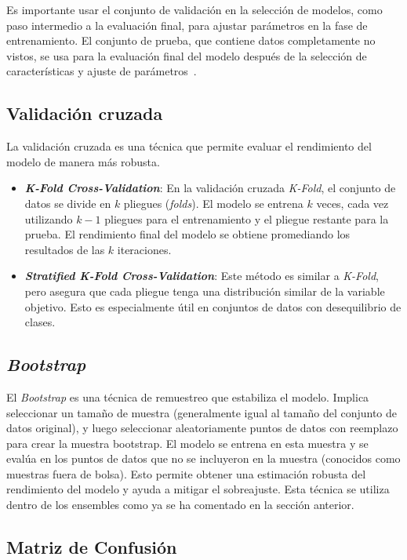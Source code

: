 Es importante usar el conjunto de validación en la selección de modelos, como paso intermedio a la evaluación final, para ajustar parámetros en la fase de entrenamiento. El conjunto de prueba, que contiene datos completamente no vistos, se usa para la evaluación final del modelo después de la selección de características y ajuste de parámetros~\cite{web:evaluate}.

\subsection{Validación cruzada}
La validación cruzada es una técnica que permite evaluar el rendimiento del modelo de manera más robusta.
\begin{itemize}
	\item \textbf{\textit{K-Fold Cross-Validation}}: En la validación cruzada \textit{K-Fold}, el conjunto de datos se divide en $k$ pliegues (\textit{folds}). El modelo se entrena $k$ veces, cada vez utilizando $k-1$ pliegues para el entrenamiento y el pliegue restante para la prueba. El rendimiento final del modelo se obtiene promediando los resultados de las $k$ iteraciones.
	\item \textbf{\textit{Stratified K-Fold Cross-Validation}}: Este método es similar a \textit{K-Fold}, pero asegura que cada pliegue tenga una distribución similar de la variable objetivo. Esto es especialmente útil en conjuntos de datos con desequilibrio de clases.
\end{itemize}

\subsection{\textit{Bootstrap}}
El \textit{Bootstrap} es una técnica de remuestreo que estabiliza el modelo. Implica seleccionar un tamaño de muestra (generalmente igual al tamaño del conjunto de datos original), y luego seleccionar aleatoriamente puntos de datos con reemplazo para crear la muestra bootstrap. El modelo se entrena en esta muestra y se evalúa en los puntos de datos que no se incluyeron en la muestra (conocidos como muestras fuera de bolsa). Esto permite obtener una estimación robusta del rendimiento del modelo y ayuda a mitigar el sobreajuste. Esta técnica se utiliza dentro de los ensembles como ya se ha comentado en la sección anterior.

\subsection{Matriz de Confusión}

